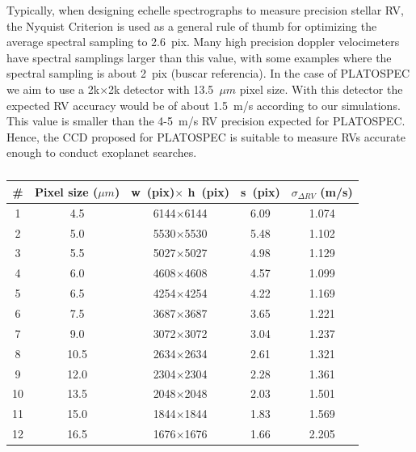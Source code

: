 \documentclass{article}
\begin{document}
Typically, when designing echelle spectrographs to measure precision stellar RV, the Nyquist Criterion is used as a general rule of thumb for optimizing the average spectral sampling to 2.6~pix. Many high precision doppler velocimeters have spectral samplings larger than this value, with some examples where the spectral sampling is about 2~pix (buscar referencia). In the case of PLATOSPEC we aim to use a 2k$\times$2k detector with 13.5~$\mu m$ pixel size. With this detector the expected RV accuracy would be of about 1.5~m/s according to our simulations. This value is smaller than the 4-5~m/s RV precision expected for PLATOSPEC. Hence, the CCD proposed for PLATOSPEC is suitable to measure RVs accurate enough to conduct exoplanet searches.

\begin{table}[h!]
    \centering
    \begin{tabular}{|c|c|c|c|c|}
    \hline
    \# & Pixel size ($\mu m$) & w~(pix)$\times$ h~(pix) & s~(pix) & $\sigma_{\Delta RV}$ (m/s) \\ \hline
    1 & 4.5 & 6144$\times$6144 & 6.09 & 1.074\\ 
    2 & 5.0 & 5530$\times$5530 & 5.48 & 1.102\\ 
    3 & 5.5 & 5027$\times$5027 & 4.98 & 1.129\\ 
    4 & 6.0 & 4608$\times$4608 & 4.57 & 1.099\\ 
    5 & 6.5 & 4254$\times$4254 & 4.22 & 1.169\\ 
    6 & 7.5 & 3687$\times$3687 & 3.65 & 1.221\\ 
    7 & 9.0 & 3072$\times$3072 & 3.04 & 1.237\\ 
    8 & 10.5 & 2634$\times$2634 & 2.61 & 1.321\\ 
    9 & 12.0 & 2304$\times$2304 & 2.28 & 1.361\\ 
    10 & 13.5 & 2048$\times$2048 & 2.03 & 1.501\\ 
    11 & 15.0 & 1844$\times$1844 & 1.83 & 1.569\\ 
    12 & 16.5 & 1676$\times$1676 & 1.66 & 2.205\\ \hline
    \end{tabular}
    \caption{}
    \label{tab:res}
\end{table}

 
\end{document}
